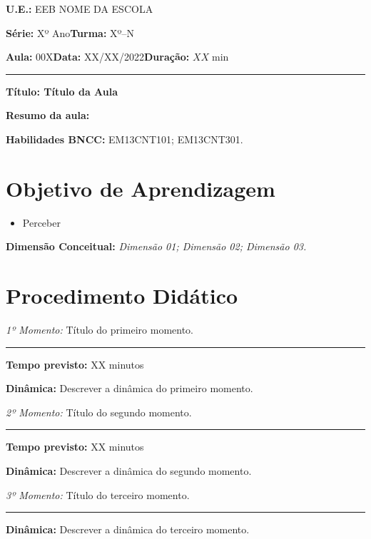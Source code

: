 \documentclass[
	12pt,				%
	openright,			%
	oneside,			%
	a4paper,			%
	chapter=TITLE,		%
	english,			%
	brazil				%
]{abntex2}
\begin{document}
    \noindent \textbf{U.E.: }EEB NOME DA ESCOLA
    
    \noindent \textbf{Série: }Xº Ano\hfill{}\textbf{Turma: }Xº--N
    
    \noindent \textbf{Aula:} 00X\hfill{}\textbf{Data:} XX/XX/2022\hfill{}\textbf{Duração:} $XX\min$
    \rule{\textwidth}{.5pt}
    \bigskip{}  
    

    \noindent \begin{center}
    \textbf{Título: Título da Aula}
    \par\end{center}

    \noindent \textbf{Resumo da aula: }

    \par\noindent \textbf{Habilidades BNCC: }EM13CNT101; EM13CNT301.
	
    \section{Objetivo de Aprendizagem}
    \begin{itemize}
        \item Perceber 
    \end{itemize}
    
    \medskip{}
    
    \noindent \textbf{Dimensão Conceitual:} \emph{Dimensão 01; Dimensão 02; Dimensão 03.}
    \newpage
    
    \section{Procedimento Didático} 
    \noindent \emph{1º Momento:} Título do primeiro momento.
	\par\noindent\rule{.3\textwidth}{.5pt}  
    \par\noindent \textbf{Tempo previsto:} XX minutos

    \noindent \textbf{Dinâmica:} Descrever a dinâmica do primeiro momento.

    \vspace{50pt}
    \noindent \emph{2º Momento:} Título do segundo momento.
	\par\noindent\rule{.3\textwidth}{.5pt}    
    \par\noindent \textbf{Tempo previsto: }XX minutos
	

    \noindent \textbf{Dinâmica:} Descrever a dinâmica do segundo momento.

	\vspace{50pt}
    \noindent \emph{3º Momento:} Título do terceiro momento.
	\par\noindent\rule{.3\textwidth}{.5pt}
    \par\noindent \textbf{Dinâmica:} Descrever a dinâmica do terceiro momento.
    
\end{document}
